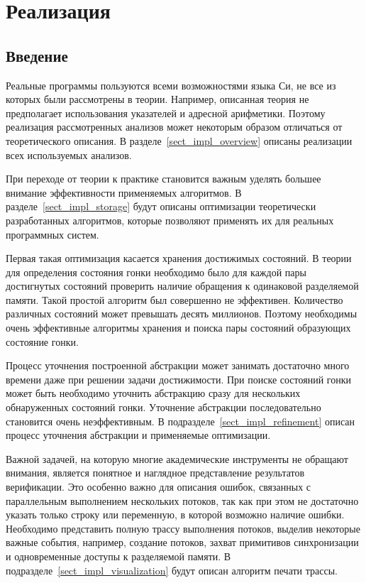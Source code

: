 \chapter{Реализация}
\label{chapter_implementation}

\section{Введение}
\label{sect_impl_introduction}

Реальные программы пользуются всеми возможностями языка Си, не все из которых были рассмотрены в теории.
Например, описанная теория не предполагает использования указателей и адресной арифметики.
Поэтому реализация рассмотренных анализов может некоторым образом отличаться от теоретического описания.
В разделе~\ref{sect_impl_overview} описаны реализации всех используемых анализов.

При переходе от теории к практике становится важным уделять большее внимание эффективности применяемых алгоритмов.
В разделе~\ref{sect_impl_storage} будут описаны оптимизации теоретически разработанных алгоритмов, которые позволяют применять их для реальных программных систем. 

Первая такая оптимизация касается хранения достижимых состояний. В теории для определения состояния гонки необходимо было для каждой пары достигнутых состояний проверить наличие обращения к одинаковой разделяемой памяти.
Такой простой алгоритм был совершенно не эффективен. Количество различных состояний может превышать десять миллионов.
Поэтому необходимы очень эффективные алгоритмы хранения и поиска пары состояний образующих состояние гонки. 

Процесс уточнения построенной абстракции может занимать достаточно много времени даже при решении задачи достижимости.
При поиске состояний гонки может быть необходимо уточнить абстракцию сразу для нескольких обнаруженных состояний гонки.
Уточнение абстракции последовательно становится очень неэффективным. В подразделе~\ref{sect_impl_refinement} описан процесс уточнения абстракции и применяемые оптимизации.

Важной задачей, на которую многие академические инструменты не обращают внимания, является понятное и наглядное представление результатов верификации.
Это особенно важно для описания ошибок, связанных с параллельным выполнением нескольких потоков, так как при этом не достаточно указать только строку или переменную, в которой возможно наличие ошибки.
Необходимо представить полную трассу выполнения потоков, выделив некоторые важные события, например, создание потоков, захват примитивов синхронизации и одновременные доступы к разделяемой памяти. В подразделе~\ref{sect_impl_visualization} будут описан алгоритм печати трассы.

